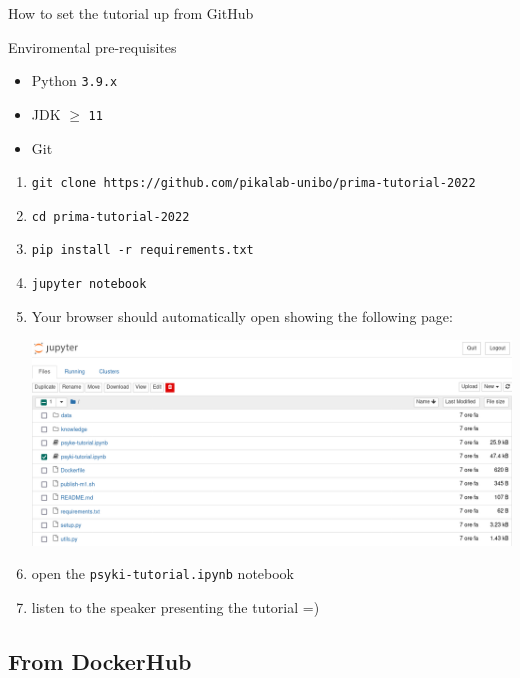 \documentclass[presentation]{beamer}\mode<presentation>{\usetheme{AMSBolognaFC}}
\begin{document}
\begin{frame}[allowframebreaks]{How to set the tutorial up from GitHub}

    \begin{block}{Enviromental pre-requisites}
        \begin{itemize}
            \item Python \alert{\texttt{3.9.x}}
            \item JDK \alert{$\geq$ \texttt{11}}
            \item Git
        \end{itemize}
    \end{block}

    \begin{enumerate}
        \item \texttt{git clone https://github.com/pikalab-unibo/prima-tutorial-2022}
        \item \texttt{cd prima-tutorial-2022}
        \item \texttt{pip install -r requirements.txt}
        \item \texttt{jupyter notebook}
        \framebreak
        \item Your browser should automatically open showing the following page:
        \begin{center}
            \includegraphics[width=.7\linewidth]{figures/jupyter-git.png}
        \end{center}
        \item open the \texttt{psyki-tutorial.ipynb} notebook
        \item listen to the speaker presenting the tutorial =)
    \end{enumerate}
\end{frame}

\subsection{From DockerHub}
\end{document}

